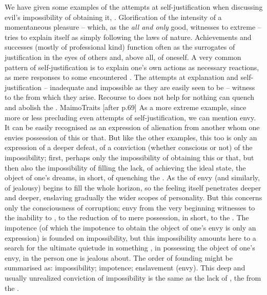 {  We have given some examples of the attempts at self-justification when
  discussing evil's impossibility of obtaining it, .
  Glorification of the intensity of a momentaneous pleasure -- which, as the
  {\em all and only} good, witnesses to extreme  -- tries to
  explain itself as simply following the laws of nature. Achievements and
  successes (mostly of professional kind) function often as the surrogates of
  justification in the eyes of others and, above all, of oneself. A very common
  pattern of self-justification is to explain one's own actions as necessary
  reactions, as mere responses to some encountered .  The
  attempts at explanation and self-justification -- inadequate and impossible as
  they are easily seen to be -- witness to the  from which they
  arise. Recourse to  does not help for nothing  can
  quench  and abolish the .  \citet{He that loves
    silver shall not be satisfied with silver.}{MaimoTraits}{ [after p.69]} As a
  more extreme example, since more or less precluding even attempts of
  self-justification, we can mention envy.  It can be easily recognised as an
  expression of alienation from another whom one envies possession of this or
  that. But like the other examples, this too is only an  expression
  of a deeper defeat, of a conviction (whether conscious or not) of the
  impossibility; first, perhaps only the impossibility of obtaining this or
  that, but then also the impossibility of filling the lack, of achieving the
  ideal state, the object of one's dreams, in short, of quenching the
  . As the  of envy (and similarly, of jealousy)
  begins to fill the whole horizon, so the feeling itself penetrates deeper and
  deeper, enslaving gradually the wider scopes of personality.  But this
   concerns only the consciousness of
  corruption; envy from the very beginning witnesses to the inability to
  , to the reduction of  to mere possession, in short, to
  the .  The impotence (of which the impotence to obtain the
  object of one's envy is only an expression) is founded on impossibility, but
  this impossibility amounts here to a search for the ultimate quietude in
  something , in possessing the object of one's envy, in
   the person one is jealous about. The order of founding might
  be summarised as: \inv impossibility; \mine impotence; \act enslavement
  (envy).  This deep and usually unrealized conviction of impossibility is the
  same as the lack of , the  from the
  .
  
}
